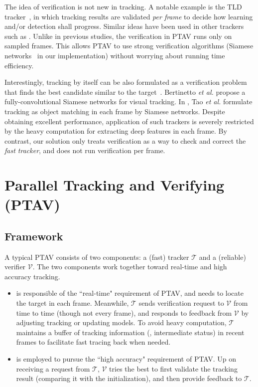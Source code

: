 \documentclass[10pt,twocolumn,letterpaper]{article}
\def \TK{\mathcal{T}}
\def \VF{\mathcal{V}}
\begin{document}
\vspace{0.4em}
 The idea of verification is not new in tracking. A notable example is the TLD tracker~\cite{kalal2012tracking}, in which tracking results are validated \emph{per frame} to decide how learning and/or detection shall progress. Similar ideas have been used in other trackers such as \cite{hua2014occlusion,hua2015online}.
Unlike in previous studies, the verification in PTAV runs only on sampled frames. This allows PTAV to use strong verification algorithms (Siamese networks~\cite{chopra2005learning} in our implementation) without worrying about running time efficiency.

Interestingly, tracking by itself can be also formulated as a verification problem that finds the best candidate similar to the target~\cite{tao2016siamese,bertinetto2016fully}. Bertinetto {\it et al.} \cite{bertinetto2016fully} propose a fully-convolutional Siamese networks for visual tracking. In \cite{tao2016siamese}, Tao {\it et al.} formulate tracking as object matching in each frame by Siamese networks. Despite obtaining excellent performance, application of such trackers is severely restricted by the heavy computation for extracting deep features in each frame. By contrast, our solution only treats verification as a way to check and correct the \emph{fast tracker}, and does not run verification per frame.

\section{Parallel Tracking and Verifying (PTAV)}

\subsection{Framework}

A typical PTAV consists of two components: a (fast) tracker $\TK$ and a (reliable) verifier $\VF$. The two components work together toward real-time and high accuracy tracking.
\begin{itemize}
\vspace{-1.55mm}\item \noindent {\bf The tracker $\TK$} is responsible of the ``real-time" requirement of PTAV, and needs to locate the target in each frame. Meanwhile, $\TK$ sends verification request to $\VF$ from time to time (though not every frame), and responds to feedback from $\VF$ by adjusting tracking or updating models. To avoid heavy computation, $\TK$ maintains a buffer of tracking information (\eg, intermediate status) in recent frames to facilitate fast tracing back when needed.

\vspace{-1.55mm}\item \noindent {\bf The verifier $\VF$} is employed to pursue the ``high accuracy" requirement of PTAV. Up on receiving a request from $\TK$, $\VF$ tries the best to first validate the tracking result (\eg comparing it with the initialization), and then provide feedback to $\TK$.
\end{itemize}
\end{document}
